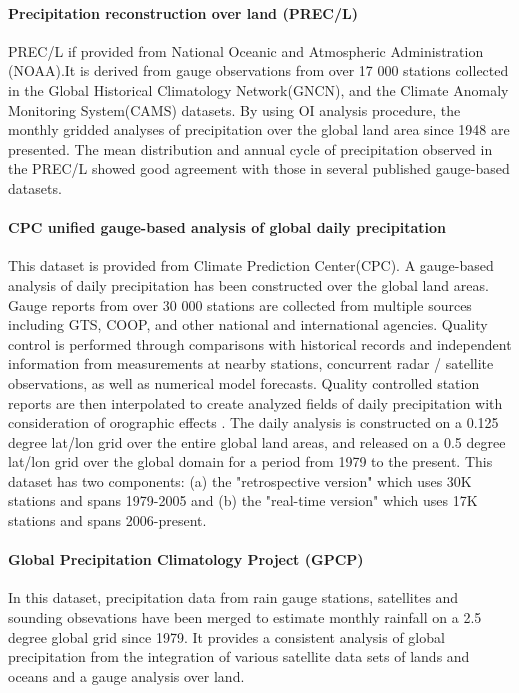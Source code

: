 \paragraph{Precipitation reconstruction over land (PREC/L)}
PREC/L if provided from National Oceanic and Atmospheric Administration (NOAA).It is derived from gauge observations from over 17 000 stations collected in the Global Historical Climatology Network(GNCN), and the Climate Anomaly Monitoring System(CAMS) datasets. By using OI analysis procedure, the monthly gridded analyses of precipitation over the global land area since 1948 are presented. The mean distribution and annual cycle of precipitation observed in the PREC/L showed good agreement with those in several published gauge-based datasets. \cite{chen2002global}
\paragraph{CPC unified gauge-based analysis of global daily precipitation}
This dataset is provided from Climate Prediction Center(CPC). A gauge-based analysis of daily precipitation has been constructed over the global land areas. Gauge reports from over 30 000 stations are collected from multiple sources including GTS, COOP, and other national and international agencies. Quality control is performed through comparisons with historical records and independent information from measurements at nearby stations, concurrent radar / satellite observations, as well as numerical model forecasts. Quality controlled station reports are then interpolated to create analyzed fields of daily precipitation with consideration of orographic effects \cite{xie2007gauge}. The daily analysis is constructed on a 0.125 degree lat/lon grid over the entire global land areas, and released on a 0.5 degree lat/lon grid over the global domain for a period from 1979 to the present.\cite{xie2010cpc} This dataset has two components: (a) the "retrospective version" which uses 30K stations and spans 1979-2005 and (b) the "real-time version" which uses 17K stations and spans 2006-present.
\paragraph{Global Precipitation Climatology Project (GPCP)}
In this dataset, precipitation data from rain gauge stations, satellites and sounding obsevations have been merged to estimate monthly rainfall on a 2.5 degree global grid since 1979. It provides a consistent analysis of global precipitation from the integration of various satellite data sets of lands and oceans and a gauge analysis over land. 
